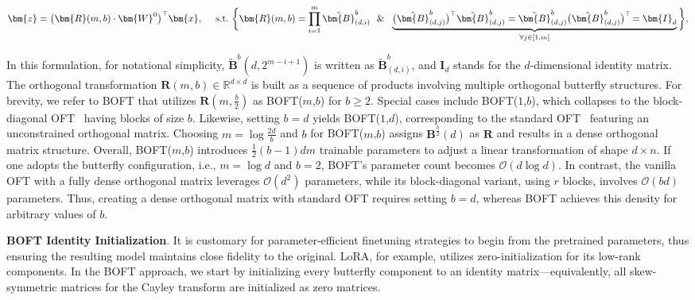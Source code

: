\begin{equation}
    \begin{aligned}\nonumber
    \bm{z}=\big(\bm{R}(m,b)\cdot\bm{W}^0\big)^\top\bm{x},~~~~\text{s.t.}~\bigg{\{}\bm{R}(m,b)=\prod_{i=1}^m \tilde{\bm{B}}^b_{(d,i)}~~\&~~\underbrace{\big(\tilde{\bm{B}}^b_{(d,j)}\big)^\top\tilde{\bm{B}}^b_{(d,j)}=\tilde{\bm{B}}^b_{(d,j)}\big(\tilde{\bm{B}}^b_{(d,j)}\big)^\top\!=\bm{I}_d}_{\forall j\in [1, m]}\bigg{\}},
    \end{aligned}
\end{equation}

In this formulation, for notational simplicity, $\tilde{\bm{B}}^b(d,2^{m - i+1})$ is written as $\tilde{\bm{B}}^b_{(d,i)}$, and $\bm{I}_d$ stands for the $d$-dimensional identity matrix. The orthogonal transformation $\bm{R}(m,b)\in\mathbb{R}^{d\times d}$ is built as a sequence of products involving multiple orthogonal butterfly structures. For brevity, we refer to BOFT that utilizes $\bm{R}(m,\frac{b}{2})$ as BOFT($m$,$b$) for $b\geq 2$. Special cases include BOFT($1$,$b$), which collapses to the block-diagonal OFT~\cite{qiu2023controlling} having blocks of size $b$. Likewise, setting $b=d$ yields BOFT($1$,$d$), corresponding to the standard OFT~\cite{qiu2023controlling} featuring an unconstrained orthogonal matrix. Choosing $m = \log \frac{2d}{b}$ and $b$ for BOFT($m$,$b$) assigns $\bm{B}^{\frac{b}{2}}(d)$ as $\bm{R}$ and results in a dense orthogonal matrix structure. Overall, BOFT($m$,$b$) introduces $\frac{1}{2}(b-1)dm$ trainable parameters to adjust a linear transformation of shape $d\times n$. If one adopts the butterfly configuration, i.e., $m=\log d$ and $b=2$, BOFT’s parameter count becomes $\mathcal{O}(d\log d)$. In contrast, the vanilla OFT with a fully dense orthogonal matrix leverages $\mathcal{O}(d^2)$ parameters, while its block-diagonal variant, using $r$ blocks, involves $\mathcal{O}(bd)$ parameters. Thus, creating a dense orthogonal matrix with standard OFT requires setting $b=d$, whereas BOFT achieves this density for arbitrary values of $b$.

\textbf{BOFT Identity Initialization}. It is customary for parameter-efficient finetuning strategies to begin from the pretrained parameters, thus ensuring the resulting model maintains close fidelity to the original. LoRA, for example, utilizes zero-initialization for its low-rank components. In the BOFT approach, we start by initializing every butterfly component to an identity matrix—equivalently, all skew-symmetric matrices for the Cayley transform are initialized as zero matrices.


